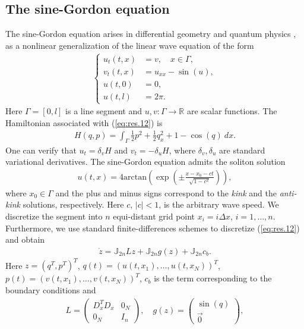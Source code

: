 \subsection{The sine-Gordon equation} \label{sec:res.2}
The sine-Gordon equation arises in differential geometry and quantum physics \cite{Misumi2015}, as a nonlinear generalization of the linear wave equation of the form
\begin{eqnarray} \label{eq:res.12}
\left\{
\begin{aligned}
	u_{t}(t,x) &= v, \quad x\in \Gamma,\\
	v_t(t,x) &= u_{xx} - \sin(u), \\
	u(t,0) &= 0, \\
	u(t,l) &= 2\pi.
\end{aligned}
\right.
\end{eqnarray}
Here $\Gamma = [0,l]$ is a line segment and $u,v: \Gamma \to \mathbb R$ are scalar functions. The Hamiltonian associated with (\ref{eq:res.12}) is
\begin{eqnarray} \label{eq:res.13}
	H(q,p) = \int_{\Gamma} \frac 1 2 p^2 + \frac 1 2 q_x^2 + 1 - \cos(q) \ dx.
\end{eqnarray}
One can verify that $u_{t} = \delta_v H$ and $v_{t} = - \delta_u H$, where $\delta_v,\delta_u$ are standard variational derivatives. The sine-Gordon equation admits the soliton solution
\begin{eqnarray} \label{eq:res.14}
	u(t,x) = 4 \text{arctan}\left( \exp \left( \pm \frac{x - x_0 - ct}{\sqrt{1-c^2}} \right) \right),
\end{eqnarray}
where $x_0 \in \Gamma$ and the plus and minus signs correspond to the \emph{kink} and the \emph{anti-kink} solutions, respectively. Here $c$, $|c|<1$, is the arbitrary wave speed. We discretize the segment into $n$ equi-distant grid point $x_i = i\Delta x$, $i=1,\dots,n$. Furthermore, we use standard finite-differences schemes to discretize (\ref{eq:res.12}) and obtain
\begin{eqnarray} \label{eq:res.15}
	\dot z = \mathbb J_{2n} L z + \mathbb J_{2n} g(z) + \mathbb J_{2n} c_b.
\end{eqnarray}
Here $z = (q^T,p^T)^T$, $q(t) = (u(t,x_1),\dots,u(t,x_N))^T$, $p(t) = (v(t,x_1),\dots,v(t,x_N))^T$, $c_b$ is the term corresponding to the boundary conditions and
\begin{eqnarray} \label{eq:res.16}
	L = 
	\begin{pmatrix}
		D_x^TD_x & 0_N \\
		0_N & I_n
	\end{pmatrix}, 
	\quad
	g(z) = 
	\begin{pmatrix}
	\sin(q) \\
	\vec 0
	\end{pmatrix},
\end{eqnarray}

